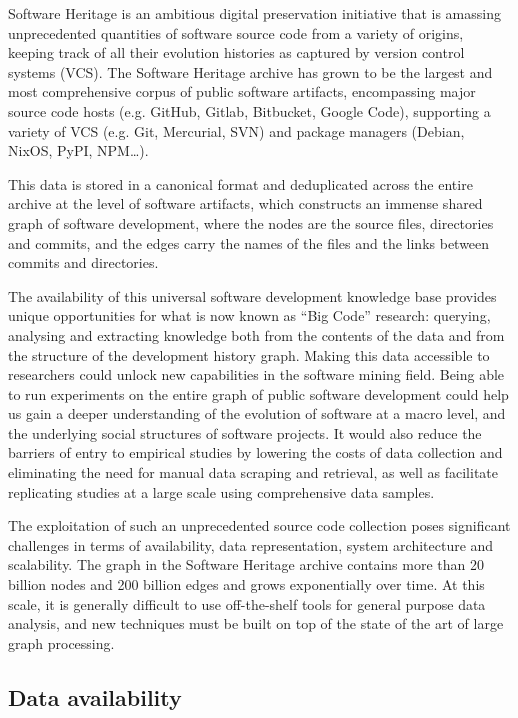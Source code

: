 Software Heritage is an ambitious digital preservation initiative that is
amassing unprecedented quantities of software source code from a variety of
origins, keeping track of all their evolution histories as captured by version
control systems (VCS). The Software Heritage archive has grown to be the
largest and most comprehensive corpus of public software artifacts,
encompassing major source code hosts (e.g. GitHub, Gitlab, Bitbucket,
Google Code), supporting a variety of VCS (e.g. Git, Mercurial, SVN) and
package managers (Debian, NixOS, PyPI, NPM…).

This data is stored in a canonical format and deduplicated across the entire
archive at the level of software artifacts, which constructs an immense shared
graph of software development, where the nodes are the source files,
directories and commits, and the edges carry the names of the files and the
links between commits and directories.

The availability of this universal software development knowledge base provides
unique opportunities for what is now known as “Big Code” research: querying,
analysing and extracting knowledge both from the contents of the data and from
the structure of the development history graph. Making this data accessible to
researchers could unlock new capabilities in the software mining field. Being
able to run experiments on the entire graph of public software development
could help us gain a deeper understanding of the evolution of software at a
macro level, and the underlying social structures of software projects. It
would also reduce the barriers of entry to empirical studies by lowering the
costs of data collection and eliminating the need for manual data scraping and
retrieval, as well as facilitate replicating studies at a large scale using
comprehensive data samples.

The exploitation of such an unprecedented source code collection poses
significant challenges in terms of availability, data representation, system
architecture and scalability. The graph in the Software Heritage archive
contains more than 20 billion nodes and 200 billion edges and grows
exponentially over time. At this scale, it is generally difficult to use
off-the-shelf tools for general purpose data analysis, and new techniques must
be built on top of the state of the art of large graph processing.

\subsection*{Data availability}

